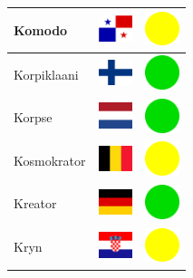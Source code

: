 \documentclass[12pt, a4paper, twoside]{report}
\begin{document}
\begin{center}
\begin{longtable}{|p{5cm}|p{2cm}|p{2cm}|}
Komodo & \includegraphics[width=1cm]{4x3/pa} & \includegraphics[width=1cm]{likes/m} \\ \hline
Korpiklaani & \includegraphics[width=1cm]{4x3/fi} & \includegraphics[width=1cm]{likes/y} \\ \hline
Korpse & \includegraphics[width=1cm]{4x3/nl} & \includegraphics[width=1cm]{likes/y} \\ \hline
Kosmokrator & \includegraphics[width=1cm]{4x3/be} & \includegraphics[width=1cm]{likes/m} \\ \hline
Kreator & \includegraphics[width=1cm]{4x3/de} & \includegraphics[width=1cm]{likes/y} \\ \hline
Kryn & \includegraphics[width=1cm]{4x3/hr} & \includegraphics[width=1cm]{likes/m} \\ \hline

\end{longtable}
\end{center}
\end{document}
